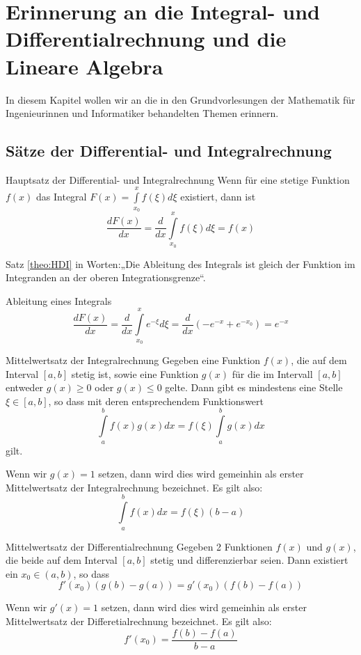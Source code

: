 \chapter[Erinnerung an die \dots]{Erinnerung an die Integral- und
Differentialrechnung und die Lineare Algebra}
In diesem Kapitel wollen wir an die in den Grundvorlesungen der Mathematik für
Ingenieurinnen und Informatiker behandelten Themen erinnern.
\section{Sätze der Differential- und Integralrechnung}
\begin{satz}{Hauptsatz der Differential- und Integralrechnung\label{theo:HSIntegralDiff}}
Wenn für eine stetige Funktion $f(x)$ das Integral
$F(x)=\int\limits_{x_0}^{x}f(\xi)d\xi$ existiert, dann ist
\[
  \frac{dF(x)}{dx}=\frac{d}{dx}\int\limits_{x_0}^{x}f(\xi)d\xi=f(x)
\]
\label{theo:HDI}
\end{satz}
Satz \ref{theo:HDI} in Worten:„Die Ableitung des Integrals ist gleich der
Funktion im Integranden an der oberen Integrationsgrenze“.
\begin{example}{Ableitung eines Integrals}
\[
 \frac{d F(x)}{dx}=\frac{d}{dx}\int\limits_{x_0}^{x}e^{-\xi}d\xi=
 \frac{d}{dx} \left(-e^{-x}+e^{-x_0}\right)=e^{-x}
\]
\end{example}
\begin{satz}{Mittelwertsatz der Integralrechnung}
  Gegeben eine Funktion $f(x)$, die auf dem Interval $[a,b]$ stetig ist, sowie
  eine Funktion $g(x)$ für die im Intervall $[a,b]$ entweder $g(x)\ge0$ oder
  $g(x)\le0$ gelte. Dann gibt es mindestens eine Stelle $\xi\in[a,b]$, so dass
  mit deren entsprechendem Funktionswert 
  \begin{equation} 
  \int\limits_a^bf(x)g(x)dx=f(\xi)\int\limits_a^bg(x)dx 
  \label{eq:MittelwertInt2} 
  \end{equation}
  gilt.   
\end{satz}
Wenn wir $g(x)=1 $ setzen, dann wird dies wird gemeinhin als erster
Mittelwertsatz der Integralrechnung bezeichnet. Es gilt also:
\begin{equation} 
  \int\limits_a^bf(x)dx=f(\xi)(b-a)
  \label{eq:MittelwertInt1}
\end{equation}
\begin{satz}{Mittelwertsatz der Differentialrechnung}
  Gegeben 2 Funktionen $f(x)$ und $g(x)$, die beide auf dem Interval $[a,b]$
  stetig und differenzierbar seien. Dann existiert ein $x_0\in(a,b)$, so dass   
  \begin{equation}
    f'(x_0)\left(g(b)-g(a)\right)= g'(x_0)\left(f(b)-f(a)\right)
  \label{eq:MittelwertDiff2}
\end{equation}
\end{satz}
Wenn wir $g'(x)=1 $ setzen, dann wird dies wird gemeinhin als erster
Mittelwertsatz der Differetialrechnung bezeichnet. Es gilt also:
\begin{equation}
  f'(x_0)=\frac{f(b)-f(a)}{b-a}
  \label{eq:MittelwertDiff1}
\end{equation}
